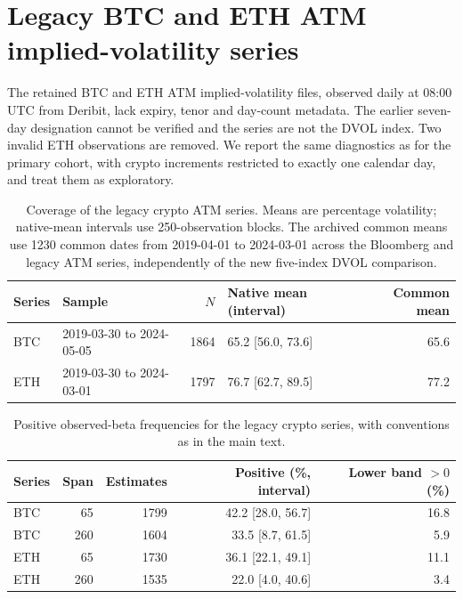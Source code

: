 \section{Legacy BTC and ETH ATM implied-volatility series}
\label{supp:crypto}
The retained BTC and ETH ATM implied-volatility files, observed daily at 08:00 UTC
from Deribit, lack expiry, tenor and day-count metadata. The earlier seven-day
designation cannot be verified and the series are not the DVOL index. Two invalid
ETH observations are removed. We report the same diagnostics as for the primary
cohort, with crypto increments restricted to exactly one calendar day, and treat
them as exploratory.

\begin{table}[htbp]\centering\small\setlength{\tabcolsep}{4pt}
\begin{tabular}{@{}l P{39mm} r P{31mm} r@{}}\toprule Series & Sample & $N$ & Native mean (interval) & Common mean\\\midrule

BTC & 2019-03-30 to 2024-05-05 & 1864 & 65.2 [56.0, 73.6] & 65.6 \\

ETH & 2019-03-30 to 2024-03-01 & 1797 & 76.7 [62.7, 89.5] & 77.2 \\

\bottomrule\end{tabular}\caption{Coverage of the legacy crypto ATM series. Means are percentage volatility; native-mean intervals use 250-observation blocks. The archived common means use 1230 common dates from 2019-04-01 to 2024-03-01 across the Bloomberg and legacy ATM series, independently of the new five-index DVOL comparison.}\label{tab:crypto-data}\end{table}

\begin{table}[htbp]\centering\small\begin{tabular}{@{}l r r r r@{}}\toprule Series & Span & Estimates & Positive (\%, interval) & Lower band $>0$ (\%)\\\midrule

BTC & 65 & 1799 & 42.2 [28.0, 56.7] & 16.8 \\

BTC & 260 & 1604 & 33.5 [8.7, 61.5] & 5.9 \\

ETH & 65 & 1730 & 36.1 [22.1, 49.1] & 11.1 \\

ETH & 260 & 1535 & 22.0 [4.0, 40.6] & 3.4 \\

\bottomrule\end{tabular}\caption{Positive observed-beta frequencies for the legacy crypto series, with conventions as in the main text.}\label{tab:crypto-beta}\end{table}

